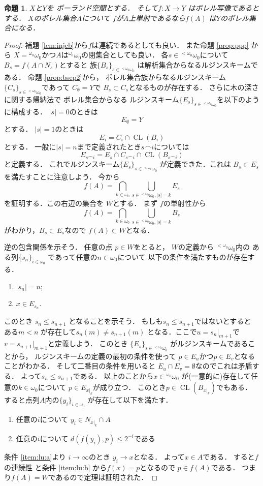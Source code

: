 \documentclass[leqno, 12pt]{jsarticle}
\newtheorem{prop}[thm]{命題}
\DeclareMathOperator{\cl}{CL}
\newcommand{\myomega}{\omega_{0}}
\newcommand{\mybairetb}{{}^{<\myomega}\myomega}
\newcommand{\mybaire}{{}^{\myomega}\myomega}
\newcommand{\myff}{\frown}
\newcommand{\mynbd}[1]{N_{#1}}
\begin{document}
\begin{prop}\label{prop:anb}
$X$と$Y$を
ポーランド空間とする．
そして$f\colon X\to Y$
はボレル写像であるとする．
$X$のボレル集合$A$について
$f$が$A$上単射であるなら$f(A)$
は$Y$のボレル集合になる．
\end{prop}
\begin{proof}
補題
\ref{lem:injcb}から$f$は連続であるとしても良い．
また命題
\ref{prop:ppp}
から
$X=\mybaire$かつ$A$は$\mybaire$の閉集合としても良い．
各$s\in \mybairetb$について
$B_{s}=f(A\cap \mynbd{s})$とすると
族$\{B_{s}\}_{s\in \mybairetb}$
は解析集合からなるルジンスキームである．
命題 \ref{prop:bsep2}から，
ボレル集合族からなるルジンスキーム
$\{C_{s}\}_{s\in \mybairetb}$であって
$C_{\emptyset}=Y$で
$B_{s}\subset C_{s}$となるものが存在する．
さらに木の深さに関する帰納法で
ボレル集合からなる
ルジンスキーム$\{E_{s}\}_{s\in \mybairetb}$を以下のように構成する．
$|s|=0$のときは
\[
E_{\emptyset}=Y
\]
とする．
$|s|=1$のときは
\[
E_{i}=C_{i}\cap \cl(B_{i})
\]
とする．
一般に$|s|=n$まで定義されたとき$s\myff i$については
\[
E_{s\myff i}=E_{s}\cap C_{s\myff i}\cap \cl(B_{s\myff i})
\]
と定義する．
これでルジンスキーム$\{E_{s}\}_{s\in \mybairetb}$
が定義できた．これは
$B_{s}\subset E_{s}$を満たすことに注意しよう．
今から
\[
f(A)=\bigcap_{k\in \myomega}\bigcup_{s\in\mybairetb, |s|=k}E_{s}
\]
を証明する．この右辺の集合を
$W$とする．
まず
$f$の単射性から
\[
f(A)=\bigcap_{k\in \myomega}\bigcup_{s\in\mybairetb, |s|=k}B_{s}
\]
がわかり，$B_{s}\subset E_{s}$なので
$f(A)\subset W$となる．

逆の包含関係を示そう．
任意の点
$p\in W$をとると，
$W$の定義から
$\mybairetb$内の
ある列$\{s_{n}\}_{i\in \myomega}$
であって任意の$n\in \myomega$について
以下の条件を満たすものが存在する．
\begin{enumerate}
\item $|s_{n}|=n$;
\item 
$x\in E_{s_{n}}$. 
\end{enumerate}
このとき
$s_{n}\le s_{n+1}$
となることを示そう．
もしも$s_{n}\le s_{n+1}$ではないとすると
ある$m<n$
が存在して$s_{n}(m)\neq s_{n+1}(m)$
となる．ここで$u=s_{n}|_{m+1}$で
$v=s_{n+1}|_{m+1}$と定義しよう．
このとき
$\{E_{s}\}_{s\in \mybairetb}$
がルジンスキームであることから，
ルジンスキームの定義の最初の条件を使って
$p\in E_{u}$かつ$p\in E_{v}$となることがわかる．
そして二番目の条件を用いると
$E_{u}\cap E_{v}=\emptyset$なのでこれは矛盾する．
よって$s_{n}\le s_{n+1}$である．
以上のことから$x\in \mybaire$
が(一意的に)存在して任意の$k\in \myomega$について
$p\in E_{x|_{k}}$が成り立つ．
このとき$p\in \cl(B_{x|_{k}})$でもある．
すると点列$A$内の$\{y_{i}\}_{i\in \myomega}$
が存在して以下を満たす．
\begin{enumerate}[label=\textup{(\alph*)}]
\item\label{item:lu:a}
任意の$i$について
$y_{i}\in \mynbd{x|_{k}}\cap A$
\item\label{item:lu:b}
任意の$i$について
$d(f(y_{i}), p)\le 2^{-i}$である
\end{enumerate}
条件
 \ref{item:lu:a}より
 $i\to \infty$のとき
 $y_{i}\to x$となる．
 よって$x\in A$である．
すると$f$の連続性
と条件
\ref{item:lu:b}
から$f(x)=p$となるので
$p\in f(A)$である．
つまり$f(A)=W$であるので定理は証明された．
\end{proof}
\end{document}
